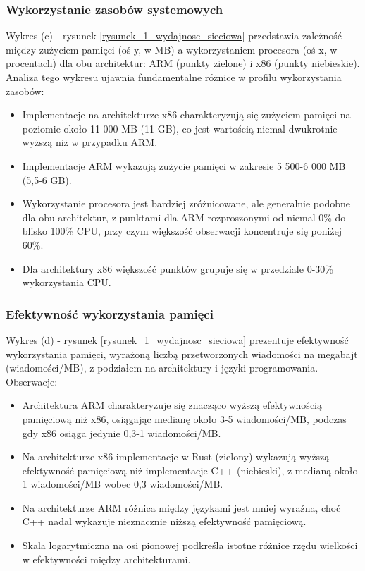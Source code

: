 \subsubsection{Wykorzystanie zasobów systemowych}
Wykres (c) - rysunek \ref{rysunek_1_wydajnosc_sieciowa} przedstawia zależność między zużyciem pamięci (oś y, w MB) a wykorzystaniem procesora (oś x, w procentach) dla obu architektur: ARM (punkty zielone) i x86 (punkty niebieskie). Analiza tego wykresu ujawnia fundamentalne różnice w profilu wykorzystania zasobów:
\begin{itemize}
    \item Implementacje na architekturze x86 charakteryzują się zużyciem pamięci na poziomie około 11 000 MB (11 GB), co jest wartością niemal dwukrotnie wyższą niż w przypadku ARM.
    \item Implementacje ARM wykazują zużycie pamięci w zakresie 5 500-6 000 MB (5,5-6 GB).
    \item Wykorzystanie procesora jest bardziej zróżnicowane, ale generalnie podobne dla obu architektur, z punktami dla ARM rozproszonymi od niemal 0\% do blisko 100\% CPU, przy czym większość obserwacji koncentruje się poniżej 60\%.
    \item Dla architektury x86 większość punktów grupuje się w przedziale 0-30\% wykorzystania CPU.
\end{itemize}

\subsubsection{Efektywność wykorzystania pamięci}
Wykres (d) - rysunek \ref{rysunek_1_wydajnosc_sieciowa} prezentuje efektywność wykorzystania pamięci, wyrażoną liczbą przetworzonych wiadomości na megabajt (wiadomości/MB), z podziałem na architektury i języki programowania. Obserwacje:
\begin{itemize}
    \item Architektura ARM charakteryzuje się znacząco wyższą efektywnością pamięciową niż x86, osiągając medianę około 3-5 wiadomości/MB, podczas gdy x86 osiąga jedynie 0,3-1 wiadomości/MB.
    \item Na architekturze x86 implementacje w Rust (zielony) wykazują wyższą efektywność pamięciową niż implementacje C++ (niebieski), z medianą około 1 wiadomości/MB wobec 0,3 wiadomości/MB.
    \item Na architekturze ARM różnica między językami jest mniej wyraźna, choć C++ nadal wykazuje nieznacznie niższą efektywność pamięciową.
    \item Skala logarytmiczna na osi pionowej podkreśla istotne różnice rzędu wielkości w efektywności między architekturami.
\end{itemize}

